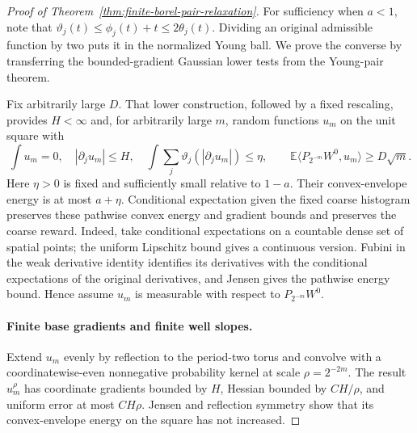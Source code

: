 \documentclass[11pt]{article}
\numberwithin{equation}{section}
\begin{document}
\begin{proof}[Proof of Theorem~\ref{thm:finite-borel-pair-relaxation}]
For sufficiency when $a<1$, note that
$\vartheta_j(t)\le\phi_j(t)+t\le2\theta_j(t)$.
Dividing an original admissible function by two puts it in the
normalized Young ball. We prove the converse by transferring the
bounded-gradient Gaussian lower tests from the Young-pair theorem.

Fix arbitrarily large $D$. That lower construction, followed by a
fixed rescaling, provides $H<\infty$ and, for arbitrarily large $m$,
random functions $u_m$ on the unit square with
\[
 \int u_m=0,\quad |\partial_j u_m|\le H,\quad
 \int\sum_j\vartheta_j(|\partial_j u_m|)\le\eta,
 \qquad
 \mathbb E\langle P_{2^{-m}}W^0,u_m\rangle\ge D\sqrt m.
\]
Here $\eta>0$ is fixed and sufficiently small relative to $1-a$.
Their convex-envelope energy is at most $a+\eta$.
Conditional expectation given the fixed coarse histogram preserves
these pathwise convex energy and gradient bounds and preserves the
coarse reward. Indeed, take conditional expectations on a countable
dense set of spatial points; the uniform Lipschitz bound gives a
continuous version. Fubini in the weak derivative identity identifies
its derivatives with the conditional expectations of the original
derivatives, and Jensen gives the pathwise energy bound. Hence assume
$u_m$ is measurable with respect to
$P_{2^{-m}}W^0$.

\paragraph{Finite base gradients and finite well slopes.}
Extend $u_m$ evenly by reflection to the period-two torus and
convolve with a coordinatewise-even nonnegative probability kernel at
scale $\rho=2^{-2m}$.
The result $u_m^\rho$ has coordinate gradients bounded by $H$,
Hessian bounded by $CH/\rho$, and uniform error at most $CH\rho$.
Jensen and reflection symmetry show that its convex-envelope
energy on the square has not increased.


\end{proof}
\end{document}
